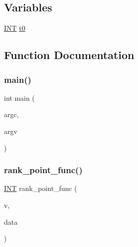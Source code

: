 \subsection*{Variables}
\begin{DoxyCompactItemize}
\item 
\mbox{\hyperlink{galois_8h_a09fddde158a3a20bd2dcadb609de11dc}{I\+NT}} \mbox{\hyperlink{factor__space_8_c_a4268f4fe222ffb119218a0199f5e1904}{t0}}
\end{DoxyCompactItemize}


\subsection{Function Documentation}
\mbox{\label{factor__space_8_c_a3c04138a5bfe5d72780bb7e82a18e627}} 
\subsubsection{\texorpdfstring{main()}{main()}}
{\footnotesize\ttfamily int main (\begin{DoxyParamCaption}\item[{int}]{argc,  }\item[{char $\ast$$\ast$}]{argv }\end{DoxyParamCaption})}

\mbox{\label{factor__space_8_c_a47d41dec0e96d7d24dbe0fb49909c8f2}} 
\subsubsection{\texorpdfstring{rank\+\_\+point\+\_\+func()}{rank\_point\_func()}}
{\footnotesize\ttfamily \mbox{\hyperlink{galois_8h_a09fddde158a3a20bd2dcadb609de11dc}{I\+NT}} rank\+\_\+point\+\_\+func (\begin{DoxyParamCaption}\item[{\mbox{\hyperlink{galois_8h_a09fddde158a3a20bd2dcadb609de11dc}{I\+NT}} $\ast$}]{v,  }\item[{void $\ast$}]{data }\end{DoxyParamCaption})}

